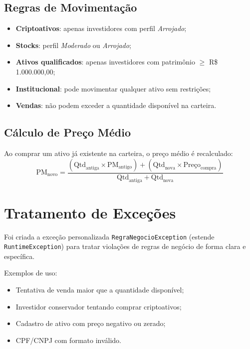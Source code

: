 \documentclass[11pt, a4paper]{article}
\begin{document}
\subsection{Regras de Movimentação}
\begin{itemize}[noitemsep]
    \item \textbf{Criptoativos}: apenas investidores com perfil \textit{Arrojado};
    \item \textbf{Stocks}: perfil \textit{Moderado} ou \textit{Arrojado};
    \item \textbf{Ativos qualificados}: apenas investidores com patrimônio $\geq$ R\$ 1.000.000,00;
    \item \textbf{Institucional}: pode movimentar qualquer ativo sem restrições;
    \item \textbf{Vendas}: não podem exceder a quantidade disponível na carteira.
\end{itemize}

\subsection{Cálculo de Preço Médio}

Ao comprar um ativo já existente na carteira, o preço médio é recalculado:
\[
\text{PM}_{\text{novo}} = \frac{(\text{Qtd}_{\text{antiga}} \times \text{PM}_{\text{antigo}}) + (\text{Qtd}_{\text{nova}} \times \text{Preço}_{\text{compra}})}{\text{Qtd}_{\text{antiga}} + \text{Qtd}_{\text{nova}}}
\]

\section{Tratamento de Exceções}

Foi criada a exceção personalizada \texttt{RegraNegocioException} (estende \texttt{RuntimeException}) para tratar violações de regras de negócio de forma clara e específica.

Exemplos de uso:
\begin{itemize}[noitemsep]
    \item Tentativa de venda maior que a quantidade disponível;
    \item Investidor conservador tentando comprar criptoativos;
    \item Cadastro de ativo com preço negativo ou zerado;
    \item CPF/CNPJ com formato inválido.
\end{itemize}
\end{document}
